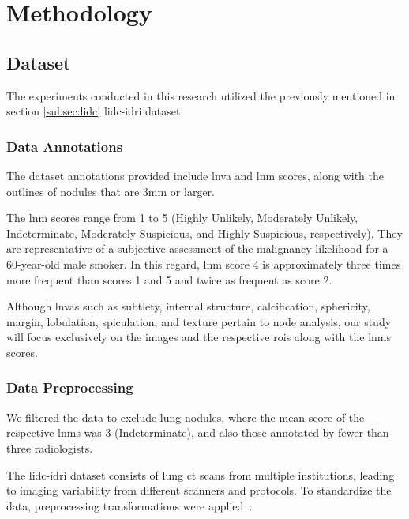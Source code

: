 \chapter{Methodology}

\section{Dataset}
The experiments conducted in this research utilized the previously mentioned in section \ref{subsec:lidc} \ac{lidc-idri} dataset. 

\subsection{Data Annotations}
The dataset annotations provided include \ac{lnva} and \ac{lnm} scores, along with the outlines of nodules that are 3mm or larger.

The \ac{lnm} scores range from 1 to 5 (Highly Unlikely, Moderately Unlikely, Indeterminate, Moderately Suspicious, and Highly Suspicious, respectively). They are representative of a subjective assessment of the malignancy likelihood for a 60-year-old male smoker.
In this regard, \ac{lnm} score 4 is approximately three times more frequent than scores 1 and 5 and twice as frequent as score 2.

Although \acp{lnva} such as subtlety, internal structure, calcification, sphericity, margin, lobulation, spiculation, and texture pertain to node analysis, our study will focus exclusively on the images and the respective \acp{roi} along with the \acp{lnm} scores.

\subsection{Data Preprocessing}

We filtered the data to exclude lung nodules, where the mean score of the respective \acp{lnm} was 3 (Indeterminate), and also those annotated by fewer than three radiologists.

The \ac{lidc-idri} dataset consists of lung \ac{ct} scans from multiple institutions, leading to imaging variability from different scanners and protocols. To standardize the data, preprocessing transformations were applied~\cite{rodrigues_efficient-proto-caps_2025}:

